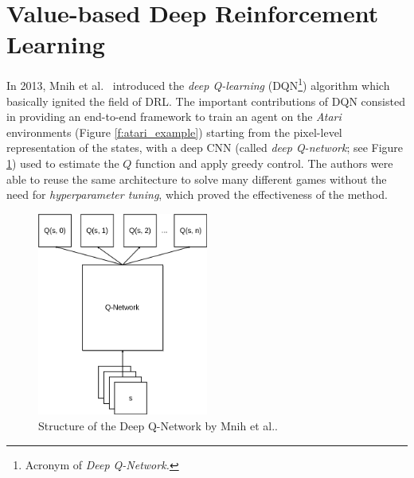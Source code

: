 \section{Value-based Deep Reinforcement Learning} \label{SOA:value}
In 2013, Mnih et al.\ \cite{mnih2015human} introduced the \textit{deep 
Q-learning} (DQN\footnote{Acronym of \textit{Deep Q-Network.}}) algorithm which 
basically ignited the field of DRL.
The important contributions of DQN consisted in providing an end-to-end 
framework to train an agent on the \textit{Atari} environments (Figure \ref{f:atari_example})
starting from the pixel-level representation of the states, with a deep CNN 
(called \textit{deep Q-network}; see Figure \ref{f:dqn_mnih}) used to estimate 
the $Q$ function and apply greedy control. 
The authors were able to reuse the same architecture to solve many different 
games without the need for \textit{hyperparameter tuning}, which proved the 
effectiveness of the method.
%
\begin{figure}[h]
\includegraphics[width=0.5\textwidth]{pictures/dqn}
\centering
\caption[Structure of the Deep Q-Network by Mnih et al.\ ]{Structure of the Deep Q-Network by Mnih et al..}
\label{f:dqn_mnih}
\end{figure}
%

